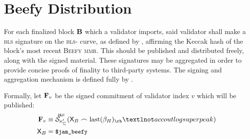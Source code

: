 \section{Beefy Distribution}\label{sec:beefy}

For each finalized block $\mathbf{B}$ which a validator imports, said validator shall make a \textsc{bls} signature on the \textsc{bls}- curve, as defined by \cite{bls12-381}, affirming the Keccak hash of the block's most recent \textsc{Beefy} \textsc{mmr}. This should be published and distributed freely, along with the signed material. These signatures may be aggregated in order to provide concise proofs of finality to third-party systems. The signing and aggregation mechanism is defined fully by \cite{cryptoeprint:2022/1611}.

Formally, let $\mathbf{F}_{v}$ be the signed commitment of validator index $v$ which will be published:
\begin{align}\label{eq:beefysignedcommitment}
  \beefycommitment{v} &\equiv \blssigndata{\activeset'\sub{v}}{\mathsf{X}_B \concat \text{last}(\recenthistory)_\rh¬accoutlogsuperpeak}\\
  \mathsf{X}_B &= \token{\$jam\_beefy}
\end{align}

